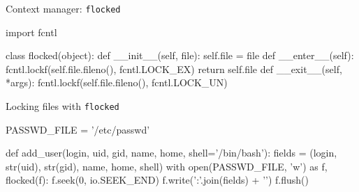 \documentclass{beamer}
\begin{document}
\begin{frame}[fragile]{Context manager: \texttt{flocked}}
  \begin{pycode}
    import fcntl

    class flocked(object):
      def __init__(self, file):
         self.file = file
      def __enter__(self):
         fcntl.lockf(self.file.fileno(), fcntl.LOCK_EX)
         return self.file
      def __exit__(self, *args):
         fcntl.lockf(self.file.fileno(), fcntl.LOCK_UN)
  \end{pycode}
\end{frame}

\begin{frame}[fragile]{Locking files with \texttt{flocked}}
  \begin{pycode}
    PASSWD_FILE = '/etc/passwd'

    def add_user(login, uid, gid, name, home,
                 shell='/bin/bash'):
        fields = (login, str(uid), str(gid),
                  name, home, shell)
        with open(PASSWD_FILE, 'w') as f, flocked(f):
            f.seek(0, io.SEEK_END)
            f.write(':'.join(fields) + '\n')
            f.flush()
  \end{pycode}
\end{frame}
\end{document}
